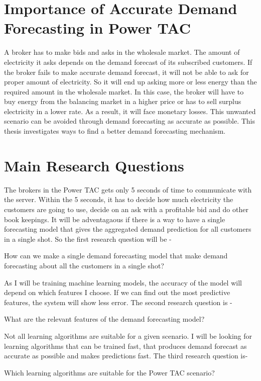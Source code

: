\section{Importance of Accurate Demand Forecasting in Power TAC}
A broker has to make bids and asks in the wholesale market. The amount of electricity it asks depends on the demand forecast of its subscribed customers. If the broker fails to make accurate demand forecast, it will not be able to ask for proper amount of electricity. So it will end up asking more or less energy than the required amount in the wholesale market. In this case, the broker will have to buy energy from the balancing market in a higher price or has to sell surplus electricity in a lower rate. As a result, it will face monetary losses. This unwanted scenario can be avoided through demand forecasting as accurate as possible. This thesis investigates ways to find a better demand forecasting mechanism.

\section{Main Research Questions}
The brokers in the Power TAC gets only 5 seconds of time to communicate with the server. Within the 5 seconds, it has to decide how much electricity the customers are going to use, decide on an ask with a profitable bid and do other book keepings. It will be adventagaous if there is a way to have a single forecasting model that gives the aggregated demand prediction for all customers in a single shot. So the first research question will be - 
\begin{displayquote}
How can we make a single demand forecasting model that make demand forecasting about all the customers in a single shot?
\end{displayquote}

As I will be training machine learning models, the accuracy of the model will depend on which features I choose. If we can find out the most predictive features, the system will show less error. The second research question is -
\begin{displayquote}
What are the relevant features of the demand forecasting model?
\end{displayquote}

Not all learning algorithms are suitable for a given scenario. I will be looking for learning algorithms that can be trained fast, that produces demand forecast as accurate as possible and makes predictions fast. The third research question is-
\begin{displayquote}
Which learning algorithms are suitable for the Power TAC scenario?
\end{displayquote}

